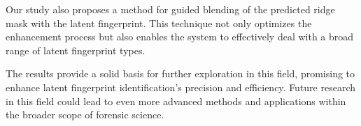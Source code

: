 \documentclass[twocolumn, switch]{article} %
\begin{document}
Our study also proposes a method for guided blending of the predicted ridge mask with the latent fingerprint. This technique not only optimizes the enhancement process but also enables the system to effectively deal with a broad range of latent fingerprint types.

The results provide a solid basis for further exploration in this field, promising to enhance latent fingerprint identification's precision and efficiency. Future research in this field could lead to even more advanced methods and applications within the broader scope of forensic science.





\normalsize



\end{document}

